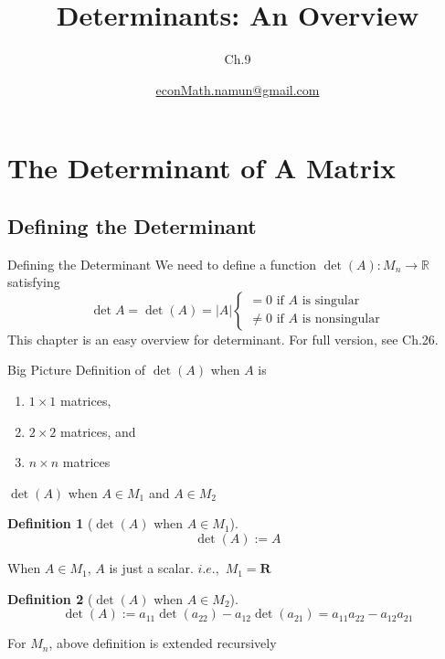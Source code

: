 \documentclass[a4paper,11pt]{article}
\author[조남운]{\url{econMath.namun@gmail.com}}
\title{Determinants: An Overview}
\subtitle{Ch.9}
\newtheorem{defn}{Definition}
\begin{document}
\maketitle


\section{The Determinant of A Matrix} %
\label{sec:the_determinant_of_a_matrix}
\subsection{Defining the Determinant} %
\label{sub:defining_the_determinant}
\begin{frame}[t]{Defining the Determinant}
	We need to define a function $\det(A): M_n \rightarrow \mathbb{R}$ satisfying
	\[
		\det A = \det(A) = \vert A\vert \begin{cases}
			= 0 \text{ if $A$ is singular}\\
			\neq 0 \text{ if $A$ is nonsingular}
		\end{cases}
	\]
	This chapter is an easy overview for determinant. For full version, see Ch.26.
	\begin{block}
		{Big Picture}
		Definition of $\det(A)$ when $A$ is
		\begin{enumerate}
			\item $1\times 1$ matrices,
			\item $2\times 2$ matrices, and
			\item $n\times n$ matrices
		\end{enumerate}
	\end{block}
\end{frame}
\begin{frame}[t]{$\det(A)$ when $A\in M_1$ and $A\in M_2$}
	\begin{defn}
		[$\det(A)$ when $A\in M_1$]
		\[
			\det(A):=A
		\]
	\end{defn}
	When $A\in M_1$, $A$ is just a scalar. $i.e.,$ $M_1 = \mathbf{R}$
	\begin{defn}
		[$\det(A)$ when $A\in M_2$]
		\[
			\det(A):= a_{11} \det(a_{22}) - a_{12}\det(a_{21}) =a_{11}a_{22}-a_{12}a_{21}
		\]
	\end{defn}
	For $M_n$, above definition is extended recursively
\end{frame}
\end{document}
